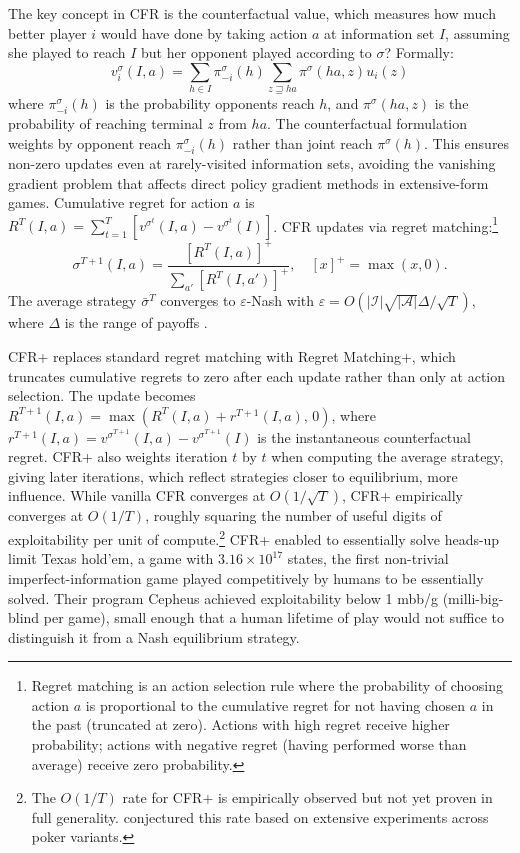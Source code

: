 The key concept in CFR is the counterfactual value, which measures how much better player $i$ would have done by taking action $a$ at information set $I$, assuming she played to reach $I$ but her opponent played according to $\sigma$? Formally:
\begin{equation}
v^\sigma_i(I, a) = \sum_{h \in I} \pi^\sigma_{-i}(h) \sum_{z \sqsupseteq ha} \pi^\sigma(ha, z) u_i(z)
\end{equation}
where $\pi^\sigma_{-i}(h)$ is the probability opponents reach $h$, and $\pi^\sigma(ha, z)$ is the probability of reaching terminal $z$ from $ha$. The counterfactual formulation weights by opponent reach $\pi^\sigma_{-i}(h)$ rather than joint reach $\pi^\sigma(h)$. This ensures non-zero updates even at rarely-visited information sets, avoiding the vanishing gradient problem that affects direct policy gradient methods in extensive-form games. Cumulative regret for action $a$ is $R^T(I,a) = \sum_{t=1}^T [v^{\sigma^t}(I,a) - v^{\sigma^t}(I)]$. CFR updates via regret matching:\footnote{Regret matching is an action selection rule where the probability of choosing action $a$ is proportional to the cumulative regret for not having chosen $a$ in the past (truncated at zero). Actions with high regret receive higher probability; actions with negative regret (having performed worse than average) receive zero probability.}
\begin{equation}
\sigma^{T+1}(I, a) = \frac{[R^T(I, a)]^+}{\sum_{a'} [R^T(I, a')]^+}, \quad [x]^+ = \max(x,0).
\end{equation}
The average strategy $\bar{\sigma}^T$ converges to $\varepsilon$-Nash with $\varepsilon = O(|\mathcal{I}|\sqrt{|\mathcal{A}|}\Delta / \sqrt{T})$, where $\Delta$ is the range of payoffs \citep{zinkevich2008}.

CFR+ \citep{tammelin2014solving} replaces standard regret matching with Regret Matching+, which truncates cumulative regrets to zero after each update rather than only at action selection. The update becomes $R^{T+1}(I, a) = \max(R^T(I, a) + r^{T+1}(I, a),\, 0)$, where $r^{T+1}(I,a) = v^{\sigma^{T+1}}(I,a) - v^{\sigma^{T+1}}(I)$ is the instantaneous counterfactual regret. CFR+ also weights iteration $t$ by $t$ when computing the average strategy, giving later iterations, which reflect strategies closer to equilibrium, more influence. While vanilla CFR converges at $O(1/\sqrt{T})$, CFR+ empirically converges at $O(1/T)$, roughly squaring the number of useful digits of exploitability per unit of compute.\footnote{The $O(1/T)$ rate for CFR+ is empirically observed but not yet proven in full generality. \citet{tammelin2014solving} conjectured this rate based on extensive experiments across poker variants.} CFR+ enabled \citet{bowling2015heads} to essentially solve heads-up limit Texas hold'em, a game with $3.16 \times 10^{17}$ states, the first non-trivial imperfect-information game played competitively by humans to be essentially solved. Their program Cepheus achieved exploitability below 1 mbb/g (milli-big-blind per game), small enough that a human lifetime of play would not suffice to distinguish it from a Nash equilibrium strategy.

